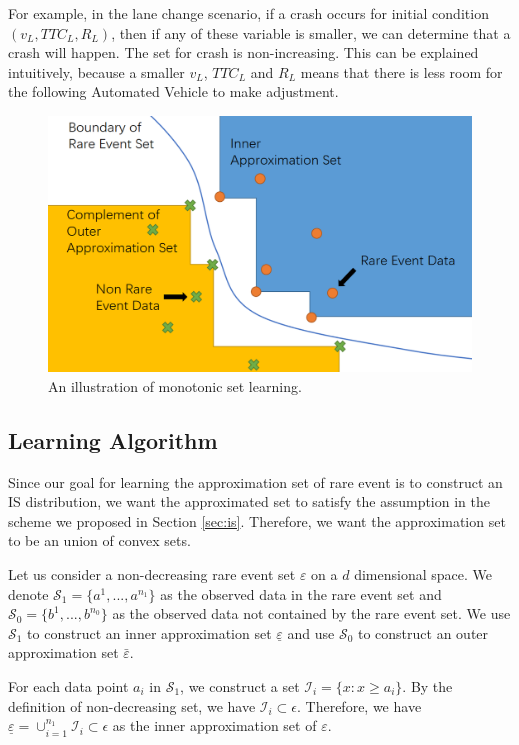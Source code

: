 \documentclass[conference]{IEEEtran}
\begin{document}
For example, in the lane change scenario, if a crash occurs for initial condition $(v_L, TTC_L, R_L)$, then if any of these variable is smaller, we can determine that a crash will happen. The set for crash is non-increasing. This can be explained intuitively, because a smaller $v_L$, $TTC_L$ and $R_L$ means that there is less room for the following Automated Vehicle to make adjustment.

\begin{figure}[t]
	\centering
	\includegraphics[width=0.8\linewidth]{monotonic_figure.png}
	\caption{An illustration of monotonic set learning.}
	\label{fig:mono}
\end{figure}


\subsection{Learning Algorithm}

Since our goal for learning the approximation set of rare event is to construct an IS distribution, we want the approximated set to satisfy the assumption in the scheme we proposed in Section \ref{sec:is}. Therefore, we want the approximation set to be an union of convex sets.

Let us consider a non-decreasing rare event set $\varepsilon $ on a $d$ dimensional space. We denote $\mathcal{S}_1=\{a^1,...,a^{n_1}\}$ as the observed data in the rare event set and $\mathcal{S}_0=\{b^1,...,b^{n_0}\}$ as the observed data not contained by the rare event set. We use $\mathcal{S}_1$ to construct an inner approximation set $\underline{\varepsilon}$ and use $\mathcal{S}_0$ to construct an outer approximation set $\bar{\varepsilon}$. 

For each data point $a_i$ in $\mathcal{S}_1$, we construct a set $\mathcal{I}_i=\{x:x \geq a_i\}$. By the definition of non-decreasing set, we have $\mathcal{I}_i \subset \epsilon$. Therefore, we have $\underline{\varepsilon}= \cup_{i=1}^{n_1} \mathcal{I}_i \subset \epsilon$ as the inner approximation set of $\varepsilon $.
\end{document}

